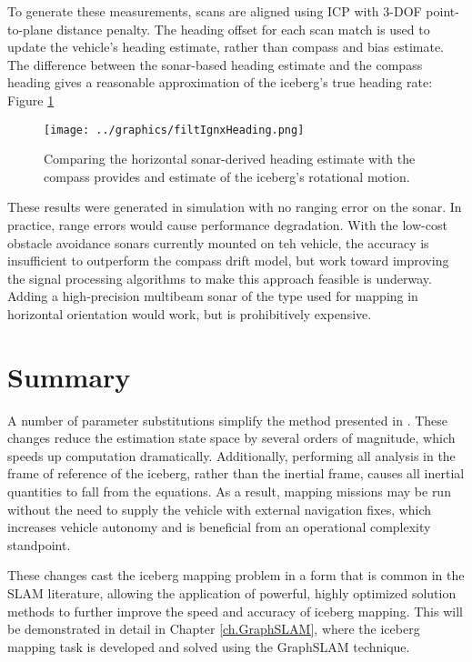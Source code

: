 To generate these measurements, scans are aligned using ICP with 3-DOF point-to-plane distance penalty. The heading offset for each scan match is used to update the vehicle's heading estimate, rather than compass and bias estimate. The difference between the sonar-based heading estimate and the compass heading gives a reasonable approximation of the iceberg's true heading rate: Figure \ref{fig:filtIgnx}


\begin{figure}[h]
   \centering
   \texttt{[image: ../graphics/filtIgnxHeading.png]} %
   \caption{Comparing the horizontal sonar-derived heading estimate with the compass provides and estimate of the iceberg's rotational motion.}
   \label{fig:filtIgnx}
\end{figure}

These results were generated in simulation with no ranging error on the sonar. In practice, range errors would cause performance degradation. With the low-cost obstacle avoidance sonars currently mounted on teh vehicle, the accuracy is insufficient to outperform the compass drift model, but work toward improving the signal processing algorithms to make this approach feasible is underway. Adding a high-precision multibeam sonar of the type used for mapping in horizontal orientation would work, but is prohibitively expensive.

\section{Summary}

A number of parameter substitutions simplify the method presented in \cite{Kimball2011b}. These changes reduce the estimation state space by several orders of magnitude, which speeds up computation dramatically. Additionally, performing all analysis in the frame of reference of the iceberg, rather than the inertial frame, causes all inertial quantities to fall from the equations. As a result, mapping missions may be run without the need to supply the vehicle with external navigation fixes, which increases vehicle autonomy and is beneficial from an operational complexity standpoint. 

These changes cast the iceberg mapping problem in a form that is common in the SLAM literature, allowing the application of powerful, highly optimized solution methods to further improve the speed and accuracy of iceberg mapping. This will be demonstrated in detail in Chapter \ref{ch.GraphSLAM}, where the iceberg mapping task is developed and solved using the GraphSLAM technique. 


